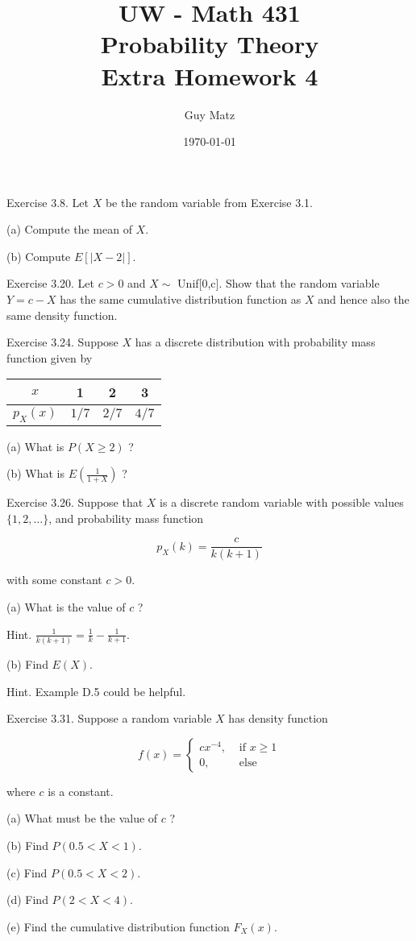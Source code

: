\documentclass[10pt]{article}
\title{UW - Math 431 \\
Probability Theory \\
Extra Homework 4}
\author{Guy Matz}
\date{\today}
\begin{document}
\hfill \break
Exercise 3.8. Let $X$ be the random variable from Exercise 3.1.

(a) Compute the mean of $X$.

(b) Compute $E[|X-2|]$.


\hfill \break
Exercise 3.20. Let $c>0$ and $X \sim$ Unif[0,c]. Show that the random variable $Y=c-X$ has the same cumulative distribution function as $X$ and hence also the same density function.

\hfill \break
Exercise 3.24. Suppose $X$ has a discrete distribution with probability mass function given by

\begin{center}
\begin{tabular}{|c|c|c|c|}
\hline
$x$ & 1 & 2 & 3 \\
\hline
$p_{X}(x)$ & $1 / 7$ & $2 / 7$ & $4 / 7$ \\
\hline
\end{tabular}
\end{center}

(a) What is $P(X \geq 2)$ ?

(b) What is $E\left(\frac{1}{1+X}\right)$ ?

\hfill \break
Exercise 3.26. Suppose that $X$ is a discrete random variable with possible values $\{1,2, \ldots\}$, and probability mass function

$$
p_{X}(k)=\frac{c}{k(k+1)}
$$

with some constant $c>0$.

(a) What is the value of $c$ ?

Hint. $\frac{1}{k(k+1)}=\frac{1}{k}-\frac{1}{k+1}$.

(b) Find $E(X)$.

Hint. Example D.5 could be helpful.

\hfill \break
Exercise 3.31. Suppose a random variable $X$ has density function

$$
f(x)= \begin{cases}c x^{-4}, & \text { if } x \geq 1 \\ 0, & \text { else }\end{cases}
$$

where $c$ is a constant.

(a) What must be the value of $c$ ?

(b) Find $P(0.5<X<1)$.

(c) Find $P(0.5<X<2)$.

(d) Find $P(2<X<4)$.

(e) Find the cumulative distribution function $F_{X}(x)$.
\end{document}
